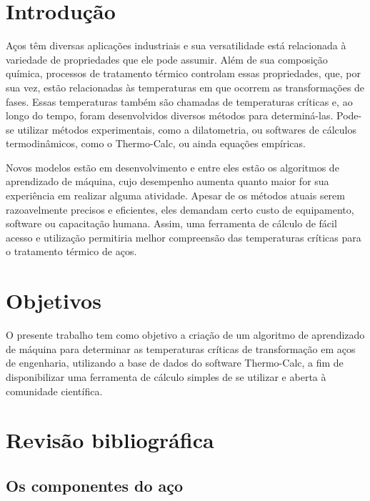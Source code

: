 \documentclass[brazil,tf,epusp]{usp}  %
\begin{document}
\setlength\parindent{.85cm}  %

\chapter{Introdução}

Aços têm diversas aplicações industriais e sua versatilidade está relacionada à variedade de propriedades que ele pode assumir. Além de sua composição química, processos de tratamento térmico controlam essas propriedades, que, por sua vez, estão relacionadas às temperaturas em que ocorrem as transformações de fases. Essas temperaturas também são chamadas de temperaturas críticas e, ao longo do tempo, foram desenvolvidos diversos métodos para determiná-las. Pode-se utilizar métodos experimentais, como a dilatometria, ou softwares de cálculos termodinâmicos, como o Thermo-Calc\textregistered{}, ou ainda equações empíricas.

Novos modelos estão em desenvolvimento e entre eles estão os algoritmos de aprendizado de máquina, cujo desempenho aumenta quanto maior for sua experiência em realizar alguma atividade. Apesar de os métodos atuais serem razoavelmente precisos e eficientes, eles demandam certo custo de equipamento, software ou capacitação humana. Assim, uma ferramenta de cálculo de fácil acesso e utilização permitiria melhor compreensão das temperaturas críticas para o tratamento térmico de aços.

\chapter{Objetivos}

O presente trabalho tem como objetivo a criação de um algoritmo de aprendizado de máquina para determinar as temperaturas críticas de transformação em aços de engenharia, utilizando a base de dados do software Thermo-Calc\textregistered{}, a fim de disponibilizar uma ferramenta de cálculo simples de se utilizar e aberta à comunidade científica.

\chapter{Revisão bibliográfica}

\section{Os componentes do aço}
\end{document}
